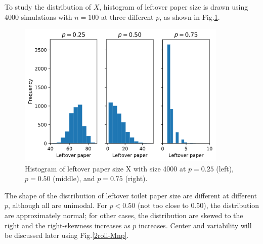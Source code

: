 \documentclass{article}
\begin{document}
To study the distribution of $X$, histogram of leftover paper size is drawn using 4000 simulations with $n=100$ at three different $p$, as shown in Fig.\ref{2roll-Histogram}.
\begin{figure}[ht]
    \centering
    \includegraphics[width=10cm]{hist-2roll.png}
    \caption{Histogram of leftover paper size X with size 4000 at $p=0.25$ (left), $p=0.50$ (middle), and $p=0.75$ (right).}
    \label{2roll-Histogram}
\end{figure}
The shape of the distribution of leftover toilet paper size are different at different $p$, although all are unimodal. For $p<0.50$ (not too close to $0.50$), the distribution are approximately normal; for other cases, the distribution are skewed to the right and the right-skewness increases as $p$ increases. Center and variability will be discussed later using Fig.\ref{2roll-Mnp}.
\end{document}
